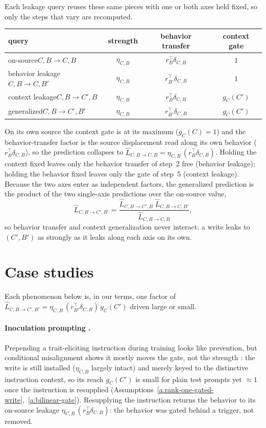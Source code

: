 \documentclass[11pt]{article}
\theoremstyle{definition}
\theoremstyle{definition}
\theoremstyle{assumptionstyle}
\newcounter{prediction}
\newcommand{\disp}{\delta_{C,B}}
\begin{document}
Each leakage query reuses these same pieces with one or both axes held fixed, so only the
steps that vary are recomputed.
\begin{center}
\begin{tabular}{lccc}
\toprule
query & strength & behavior transfer & context gate\\
\midrule
on-source\quad $C,B\to C,B$ & $\eta_{C,B}$ & $r_B^\top \disp$ & $1$\\
behavior leakage\quad $C,B\to C,B'$ & $\eta_{C,B}$ & $r_{B'}^\top \disp$ & $1$\\
context leakage\quad $C,B\to C',B$ & $\eta_{C,B}$ & $r_B^\top \disp$ & $g_{C}(C')$\\
generalized\quad $C,B\to C',B'$ & $\eta_{C,B}$ & $r_{B'}^\top \disp$ & $g_{C}(C')$\\
\bottomrule
\end{tabular}
\end{center}
On its own source the context gate is at its maximum ($g_{C}(C)=1$) and the
behavior-transfer factor is the source displacement read along its own behavior
($r_B^\top\disp$), so the prediction collapses to
$\widehat L_{C,B\to C,B}=\eta_{C,B}\,(r_B^\top\disp)$. Holding the context fixed leaves
only the behavior transfer of step~2 free (behavior leakage); holding the behavior fixed
leaves only the gate of step~5 (context leakage). Because the two axes enter as
independent factors, the generalized prediction is the product of the two single-axis
predictions over the on-source value,
\[
\widehat L_{C,B\to C',B'}
=\frac{\widehat L_{C,B\to C',B}\;\widehat L_{C,B\to C,B'}}{\widehat L_{C,B\to C,B}},
\]
so behavior transfer and context generalization never interact: a write leaks to
$(C',B')$ as strongly as it leaks along each axis on its own.
\section{Case studies}
\label{sec:cases}
Each phenomenon below is, in our terms, one factor of
$\widehat L_{C,B\to C',B'}=\eta_{C,B}\,(r_{B'}^\top \disp)\,g_{C}(C')$ driven
large or small.

\paragraph{Inoculation prompting \cite{tan2025inoculation}.} Prepending a trait-eliciting
instruction during training looks like prevention, but conditional misalignment shows it
mostly moves the gate, not the strength \cite{dubinski2026}: the write is still installed
($\eta_{C,B}$ largely intact) and merely keyed to the distinctive instruction context, so
its reach $g_{C}(C')$ is small for plain test prompts yet $\approx 1$ once the
instruction is resupplied (Assumptions~\ref{a:rank-one-gated-write},~\ref{a:bilinear-gate}).
Resupplying the instruction returns the behavior to its on-source leakage
$\eta_{C,B}\,(r_B^\top\disp)$: the behavior was gated behind a trigger, not removed.
\end{document}
